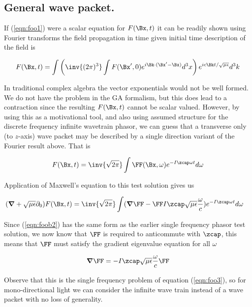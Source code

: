 \subsection{General wave packet.}

If (\ref{eqn:foo1}) were a scalar equation for $F(\Bx,t)$ it can be readily shown using Fourier transforms the field propagation in time given initial time description of the field is 

\begin{align}\label{eqn:foob1}
F(\Bx, t) = \int \left( \inv{(2\pi)^3} \int F(\Bx', 0) e^{i\Bk \cdot (\Bx' -\Bx)} d^3 x \right) e^{i c \Bk t/ \sqrt{\mu\epsilon}} d^3 k
\end{align}

In traditional complex algebra the vector exponentials would not be well formed.  We do not have the problem in the GA formalism, but this does lead to a contraction since the resulting $F(\Bx,t)$ cannot be scalar valued.  However, by using this as a motivational tool, and 
also using assumed structure for the discrete frequency infinite wavetrain phasor, we can guess that a transverse only (to $z$-axis) wave packet may be described by a single direction variant of the Fourier result above.  That is

\begin{align}\label{eqn:foob2}
F(\Bx, t) = \inv{\sqrt{2\pi}} \int \FF(\Bx, \omega) e^{-I \zcap \omega t} d\omega
\end{align}

Application of Maxwell's equation to this test solution gives us

\begin{align}\label{eqn:foob3}
(\spacegrad +\sqrt{\mu\epsilon} \partial_0) F(\Bx,t) &=
\inv{\sqrt{2\pi}}\int (\spacegrad \FF - \FF I \zcap \sqrt{\mu\epsilon} \frac{\omega}{c}) e^{-I \zcap \omega t} d\omega
\end{align}

Since (\ref{eqn:foob2}) has the same form as the earlier single frequency phasor test solution, we now know that $\FF$ is required to anticommute with $\zcap$, this means that $\FF$ must satisfy the gradient eigenvalue equation for all $\omega$

\begin{align}\label{eqn:foob4}
\spacegrad \FF = -I \zcap \sqrt{\mu\epsilon} \frac{\omega}{c} \FF 
\end{align}

Observe that this is the single frequency problem of equation (\ref{eqn:foo3}), so for mono-directional light we can consider the infinite
wave train instead of a wave packet with no loss of generality.

